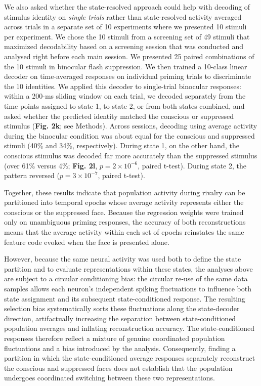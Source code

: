 \documentclass{article}
\begin{document}
We also asked whether the state-resolved approach could help with decoding of stimulus identity on \textit{single trials} rather than state-resolved activity averaged across trials in a separate set of 10 experiments where we presented 10 stimuli per experiment. We chose the 10 stimuli from a screening set of 49 stimuli that maximized decodability based on a screening session that was conducted and analysed right before each main session. We presented 25 paired combinations of the 10 stimuli in binocular flash suppression. We then trained a 10-class linear decoder on time-averaged responses on individual priming trials to discriminate the 10 identities. We applied this decoder to single-trial binocular responses: within a 200-ms sliding window on each trial, we decoded separately from the time points assigned to state 1, to state 2, or from both states combined, and asked whether the predicted identity matched the conscious or suppressed stimulus (\textbf{Fig. 2k}; see Methods). Across sessions, decoding using average activity during the binocular condition was about equal for the conscious and suppressed stimuli (40\% and 34\%, respectively). During state 1, on the other hand, the conscious stimulus was decoded far more accurately than the suppressed stimulus (over 61\% versus 4\%; \textbf{Fig. 2l}, $p = 2 \times 10^{-6}$, paired t-test). During state 2, the pattern reversed ($p = 3 \times 10^{-7}$, paired t-test).

Together, these results indicate that population activity during rivalry can be partitioned into temporal epochs whose average activity represents either the conscious or the suppressed face. Because the regression weights were trained only on unambiguous priming responses, the accuracy of both reconstructions means that the average activity within each set of epochs reinstates the same feature code evoked when the face is presented alone.

However, because the same neural activity was used both to define the state partition and to evaluate representations within these states, the analyses above are subject to a circular conditioning bias: the circular re-use of the same data samples allows each neuron's independent spiking fluctuations to influence both state assignment and its subsequent state-conditioned response. The resulting selection bias systematically sorts these fluctuations along the state-decoder direction, artifactually increasing the separation between state-conditioned population averages and inflating reconstruction accuracy. The state-conditioned responses therefore reflect a mixture of genuine coordinated population fluctuations and a bias introduced by the analysis. Consequently, finding a partition in which the state-conditioned average responses separately reconstruct the conscious and suppressed faces does not establish that the population undergoes coordinated switching between these two representations.
\end{document}
